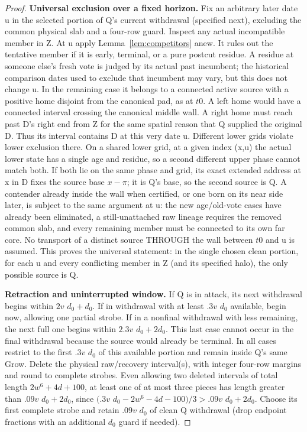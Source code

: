 \begin{proof}
\textbf{Universal exclusion over a fixed horizon.} Fix an arbitrary later date u in the selected portion of Q's current withdrawal (specified next), excluding the common physical slab and a four-row guard. Inspect any actual incompatible member in Z. At u apply Lemma~\ref{lem:competitors} anew. It rules out the tentative member if it is early, terminal, or a pure postcut residue. A residue at someone else's fresh vote is judged by its actual past incumbent; the historical comparison dates used to exclude that incumbent may vary, but this does not change u. In the remaining case it belongs to a connected active source with a positive home disjoint from the canonical pad, as at \(t0\). A left home would have a connected interval crossing the canonical middle wall. A right home must reach past D's right end from Z for the same spatial reason that Q supplied the original D. Thus its interval contains D at this very date u. Different lower grids violate lower exclusion there. On a shared lower grid, at a given index (x,u) the actual lower state has a single age and residue, so a second different upper phase cannot match both. If both lie on the same phase and grid, its exact extended address at x in D fixes the source base \(x-\pi\); it is Q's base, so the second source is Q. A contender already inside the wall when certified, or one born on its near side later, is subject to the same argument at u: the new age/old-vote cases have already been eliminated, a still-unattached raw lineage requires the removed common slab, and every remaining member must be connected to its own far core. No transport of a distinct source THROUGH the wall between \(t0\) and u is assumed. This proves the universal statement: in the single chosen clean portion, for each u and every conflicting member in Z (and its specified halo), the only possible source is Q.

\textbf{Retraction and uninterrupted window.} If Q is in attack, its next withdrawal begins within \(2v\) \(d_0+d_0\). If in withdrawal with at least \(.3v\) \(d_0\) available, begin now, allowing one partial strobe. If in a nonfinal withdrawal with less remaining, the next full one begins within \(2.3v\) \(d_0+2d_0\). This last case cannot occur in the final withdrawal because the source would already be terminal. In all cases restrict to the first \(.3v\) \(d_0\) of this available portion and remain inside Q's same Grow. Delete the physical raw/recovery interval(s), with integer four-row margins and round to complete strobes. Even allowing two deleted intervals of total length \(2w^6+4d+100\), at least one of at most three pieces has length greater than \(.09v\) \(d_0+2d_0\), since \((.3v\) \(d_0- 2w^6- 4d- 100)/3>.09v\) \(d_0+2d_0\). Choose its first complete strobe and retain \(.09v\) \(d_0\) of clean Q withdrawal (drop endpoint fractions with an additional \(d_0\) guard if needed).


\end{proof}
